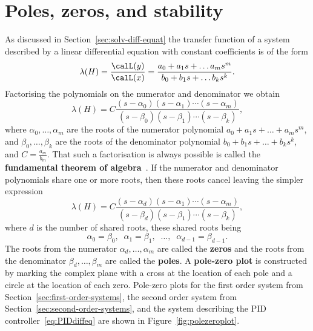 \documentclass[11pt,a4paper]{book}
\theoremstyle{plain}
\numberwithin{equation}{section}
\newcommand{\term}{\textbf}
\begin{document}
\section{Poles, zeros, and stability}

As discussed in Section~\ref{sec:solv-diff-equat} the transfer function of a system described by a linear differential equation with constant coefficients is of the form
\[
\lambda(H) = \frac{\calL(y)}{\calL(x)} = \frac{a_0 + a_1s + \dots a_m s^m}{b_0 + b_1s + \dots b_k s^k}.
\]
Factorising the polynomials on the numerator and denominator we obtain
\[
\lambda(H) = C\frac{(s-\alpha_0)(s - \alpha_1)\cdots(s - \alpha_m)}{(s-\beta_0)(s - \beta_1)\cdots(s - \beta_k)},
\] 
where $\alpha_0, \dots, \alpha_m$ are the roots of the numerator polynomial $a_0 + a_1s + \dots + a_m s^m$, and $\beta_0, \dots, \beta_k$ are the roots of the denominator polynomial $b_0 + b_1s + \dots + b_k s^k$, and $C = \tfrac{a_m}{b_m}$.  That such a factorisation is always possible is called the \term{fundamental theorem of algebra}~\citep{Fine_fundamental_theorem_of_algebra}.  %
If the numerator and denominator polynomials share one or more roots, then these roots cancel leaving the simpler expression
\begin{equation}\label{eq:transfuncpoleszeros}
\lambda(H) = C\frac{(s-\alpha_d)(s - \alpha_1)\cdots(s - \alpha_{m})}{(s-\beta_d)(s - \beta_1)\cdots(s - \beta_{k})},
\end{equation}
where $d$ is the number of shared roots, these shared roots being 
\[
\alpha_0 = \beta_0, \;\; \alpha_1 = \beta_1, \;\; \dots, \;\;  \alpha_{d-1} = \beta_{d-1}.
\]
The roots from the numerator $\alpha_d, \dots, \alpha_m$ are called the \term{zeros} and the roots from the denominator $\beta_d, \dots, \beta_m$ are called the \term{poles}.  A \term{pole-zero plot} is constructed by marking the complex plane with a cross at the location of each pole and a circle at the location of each zero.  Pole-zero plots for the first order system from Section~\ref{sec:first-order-systems}, the second order system from Section~\ref{sec:second-order-systems}, and the system describing the PID controller~\eqref{eq:PIDdiffeq} are shown in Figure~\ref{fig:polezeroplot}.
\end{document}

